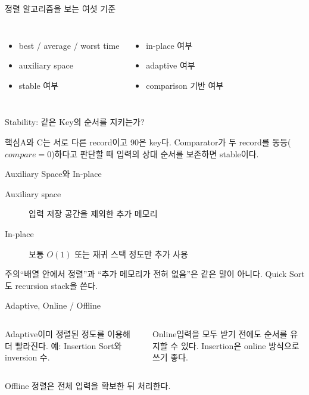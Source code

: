 \begin{frame}{정렬 알고리즘을 보는 여섯 기준}
\begin{columns}[T]\begin{itemize}\item best / average / worst time\item auxiliary space\item stable 여부\end{itemize}\begin{itemize}\item in-place 여부\item adaptive 여부\item comparison 기반 여부\end{itemize}\end{columns}
\end{frame}
\begin{frame}{Stability: 같은 Key의 순서를 지키는가?}
\centering{}
\begin{block}{핵심}A와 C는 서로 다른 record이고 90은 key다. Comparator가 두 record를 동등($compare=0$)하다고 판단할 때 입력의 상대 순서를 보존하면 stable이다.\end{block}
\end{frame}
\begin{frame}{Auxiliary Space와 In-place}
\begin{description}\item[Auxiliary space] 입력 저장 공간을 제외한 추가 메모리\item[In-place] 보통 $O(1)$ 또는 재귀 스택 정도만 추가 사용\end{description}
\begin{alertblock}{주의}“배열 안에서 정렬”과 “추가 메모리가 전혀 없음”은 같은 말이 아니다. Quick Sort도 recursion stack을 쓴다.\end{alertblock}
\end{frame}
\begin{frame}{Adaptive, Online / Offline}
\begin{columns}[T]\begin{block}{Adaptive}\small 이미 정렬된 정도를 이용해 더 빨라진다. 예: Insertion Sort와 inversion 수.\end{block}\begin{block}{Online}\small 입력을 모두 받기 전에도 순서를 유지할 수 있다. Insertion은 online 방식으로 쓰기 좋다.\end{block}\end{columns}
\vspace{4mm}\centering Offline 정렬은 전체 입력을 확보한 뒤 처리한다.
\end{frame}
